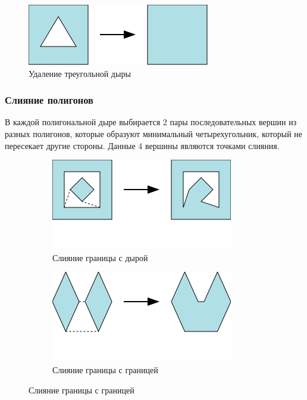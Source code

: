 \documentclass{fefu_thesis/cls/fefu}
\begin{document}
    \begin{figure}[H]
        \centering
        \includegraphics[scale=1]{images/remove_triangular_hole.png}
        \caption{Удаление треугольной дыры}
    \end{figure}

    \subsubsection{Слияние полигонов}

    В каждой полигональной дыре выбирается 2 пары последовательных вершин из разных полигонов, которые образуют минимальный четырехугольник, который не пересекает другие стороны. Данные 4 вершины являются точками слияния.

    \begin{figure}[H]
        \centering
        \begin{subfigure}[t]{\linewidth}
            \centering
            \includegraphics[scale=1]{images/polygonmerge.png}
            \caption{Слияние границы с дырой}
        \end{subfigure}
        \begin{subfigure}[t]{\linewidth}
            \centering
            \includegraphics[scale=1]{images/polygonmerge2.png}
            \caption{Слияние границы с границей}
        \end{subfigure}
    \end{figure}
\end{document}
